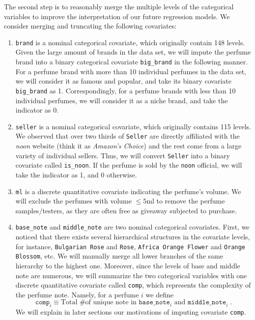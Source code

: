 \documentclass[12pt]{amsart}
\begin{document}
The second step is to reasonably merge the multiple levels of the categorical variables to improve the interpretation of our future regression models. We consider merging and truncating the following covariates:

\begin{enumerate}
    \item \texttt{brand} is a nominal categorical covariate, which originally contain 148 levels. Given the large amount of brands in the data set, we will impute the perfume brand into a binary categorical covariate \texttt{big\_brand} in the following manner. For a perfume brand with more than 10 individual perfumes in the data set, we will consider it as famous and popular, and take its binary covariate \texttt{big\_brand} as 1. Correspondingly, for a perfume brands with less than 10 individual perfumes, we will consider it as a niche brand, and take the indicator as 0.
    \item \texttt{seller} is a nominal categorical covariate, which originally contains 115 levels. We observed that over two thirds of \texttt{Seller} are directly affiliated with the \textit{noon} website (think it as \textit{Amazon's Choice}) and the rest come from a large variety of individual sellers. Thus, we will convert \texttt{Seller} into a binary covariate called \texttt{is\_noon}. If the perfume is sold by the \texttt{noon} official, we will take the indicator as 1, and 0 otherwise.
    \item \texttt{ml} is a discrete quantitative covariate indicating the perfume's volume. We will exclude the perfumes with volume $\leq 5$ml to remove the perfume samples/testers, as they are often free as giveaway subjected to purchase.
    \item \texttt{base\_note} and \texttt{middle\_note} are two nominal categorical covariates. First, we noticed that there exists several hierarchical structures in the covariate levels, for instance,  \texttt{Bulgarian Rose} and \texttt{Rose}, \texttt{Africa Orange Flower} and \texttt{Orange Blossom}, etc. We will manually merge all lower branches of the same hierarchy to the highest one. Moreover, since the levels of base and middle note are numerous, we will summarize the two categorical variables with one discrete quantitative covariate called \texttt{comp}, which represents the complexity of the perfume note. Namely, for a perfume $i$ we define
    \[\texttt{comp}_i \equiv \text{Total \# of unique note in }  \texttt{base\_note}_i \text{ and } \texttt{middle\_note}_i \;.\]
    We will explain in later sections our motivations of imputing covariate \texttt{comp}.
\end{enumerate}
\end{document}
